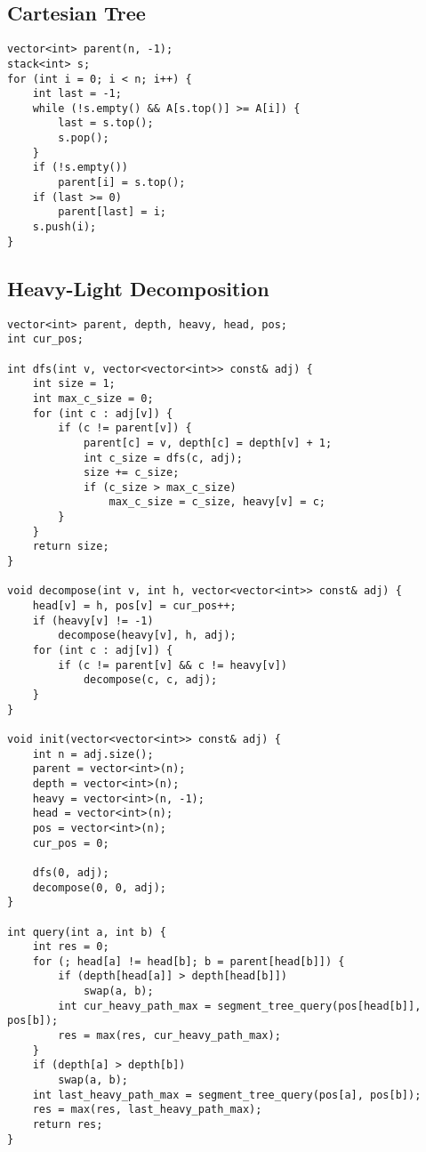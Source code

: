\documentclass[10pt]{article}
\begin{document}
\begin{multicols*}{2}
\subsection{Cartesian Tree}

\begin{lstlisting}[style=compactcpp]
vector<int> parent(n, -1);
stack<int> s;
for (int i = 0; i < n; i++) {
    int last = -1;
    while (!s.empty() && A[s.top()] >= A[i]) {
        last = s.top();
        s.pop();
    }
    if (!s.empty())
        parent[i] = s.top();
    if (last >= 0)
        parent[last] = i;
    s.push(i);
}
\end{lstlisting}

\subsection{Heavy-Light Decomposition}

\begin{lstlisting}[style=compactcpp]
vector<int> parent, depth, heavy, head, pos;
int cur_pos;

int dfs(int v, vector<vector<int>> const& adj) {
    int size = 1;
    int max_c_size = 0;
    for (int c : adj[v]) {
        if (c != parent[v]) {
            parent[c] = v, depth[c] = depth[v] + 1;
            int c_size = dfs(c, adj);
            size += c_size;
            if (c_size > max_c_size)
                max_c_size = c_size, heavy[v] = c;
        }
    }
    return size;
}

void decompose(int v, int h, vector<vector<int>> const& adj) {
    head[v] = h, pos[v] = cur_pos++;
    if (heavy[v] != -1)
        decompose(heavy[v], h, adj);
    for (int c : adj[v]) {
        if (c != parent[v] && c != heavy[v])
            decompose(c, c, adj);
    }
}

void init(vector<vector<int>> const& adj) {
    int n = adj.size();
    parent = vector<int>(n);
    depth = vector<int>(n);
    heavy = vector<int>(n, -1);
    head = vector<int>(n);
    pos = vector<int>(n);
    cur_pos = 0;

    dfs(0, adj);
    decompose(0, 0, adj);
}

int query(int a, int b) {
    int res = 0;
    for (; head[a] != head[b]; b = parent[head[b]]) {
        if (depth[head[a]] > depth[head[b]])
            swap(a, b);
        int cur_heavy_path_max = segment_tree_query(pos[head[b]], pos[b]);
        res = max(res, cur_heavy_path_max);
    }
    if (depth[a] > depth[b])
        swap(a, b);
    int last_heavy_path_max = segment_tree_query(pos[a], pos[b]);
    res = max(res, last_heavy_path_max);
    return res;
}
\end{lstlisting}


\end{multicols*}
\end{document}
